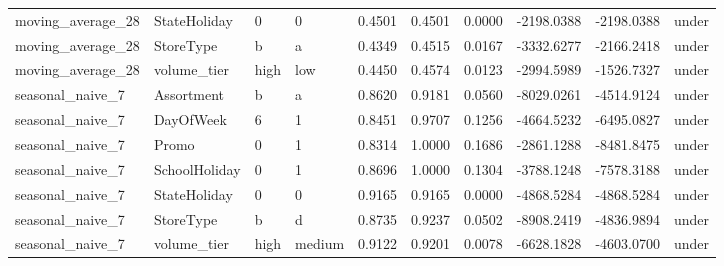 \begin{table}
\begin{tabular}{llllrrrrrl}
moving\_average\_28 & StateHoliday & 0 & 0 & 0.4501 & 0.4501 & 0.0000 & -2198.0388 & -2198.0388 & under \\
moving\_average\_28 & StoreType & b & a & 0.4349 & 0.4515 & 0.0167 & -3332.6277 & -2166.2418 & under \\
moving\_average\_28 & volume\_tier & high & low & 0.4450 & 0.4574 & 0.0123 & -2994.5989 & -1526.7327 & under \\
seasonal\_naive\_7 & Assortment & b & a & 0.8620 & 0.9181 & 0.0560 & -8029.0261 & -4514.9124 & under \\
seasonal\_naive\_7 & DayOfWeek & 6 & 1 & 0.8451 & 0.9707 & 0.1256 & -4664.5232 & -6495.0827 & under \\
seasonal\_naive\_7 & Promo & 0 & 1 & 0.8314 & 1.0000 & 0.1686 & -2861.1288 & -8481.8475 & under \\
seasonal\_naive\_7 & SchoolHoliday & 0 & 1 & 0.8696 & 1.0000 & 0.1304 & -3788.1248 & -7578.3188 & under \\
seasonal\_naive\_7 & StateHoliday & 0 & 0 & 0.9165 & 0.9165 & 0.0000 & -4868.5284 & -4868.5284 & under \\
seasonal\_naive\_7 & StoreType & b & d & 0.8735 & 0.9237 & 0.0502 & -8908.2419 & -4836.9894 & under \\
seasonal\_naive\_7 & volume\_tier & high & medium & 0.9122 & 0.9201 & 0.0078 & -6628.1828 & -4603.0700 & under \\
\bottomrule
\end{tabular}
\end{table}
